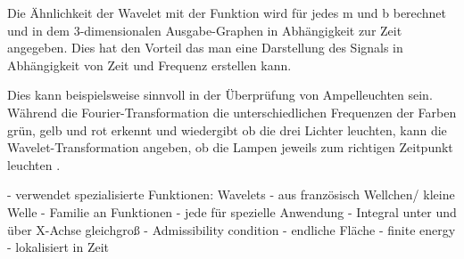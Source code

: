 \par

Die Ähnlichkeit der Wavelet mit der Funktion wird für jedes m und b berechnet und in dem 3-dimensionalen Ausgabe-Graphen in Abhängigkeit zur Zeit angegeben. Dies hat den Vorteil das man eine Darstellung des Signals in Abhängigkeit von Zeit und Frequenz erstellen kann.

\par

Dies kann beispielsweise sinnvoll in der Überprüfung von Ampelleuchten sein. Während die Fourier-Transformation die unterschiedlichen Frequenzen der Farben grün, gelb und rot erkennt und wiedergibt ob die drei Lichter leuchten, kann die Wavelet-Transformation angeben, ob die Lampen jeweils zum richtigen Zeitpunkt leuchten \parencite{wavelets}.

%
 - verwendet spezialisierte Funktionen: Wavelets
 - aus französisch Wellchen/ kleine Welle
 - Familie an Funktionen
   - jede für spezielle Anwendung
 - Integral unter und über X-Achse gleichgroß
   - Admissibility condition
 - endliche Fläche
   - finite energy
   - lokalisiert in Zeit